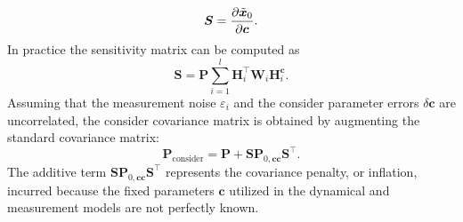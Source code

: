 \documentclass[pdflatex,sn-mathphys-num]{sn-jnl}%
\theoremstyle{thmstyleone}%
\theoremstyle{thmstyletwo}%
\theoremstyle{thmstylethree}%
\renewcommand{\vec}[1]{\boldsymbol{#1}}
\begin{document}
\begin{equation}
	\vec{S} = \pdv{\tilde{\vec{x}}_{0}}{\vec{c}}.
\end{equation}
In practice the sensitivity matrix can be computed as 
\begin{equation}
    \vec{S} = \vec{P} \sum_{i=1}^{l} \vec{H}_{i}^\top \vec{W}_i \vec{H}_{i}^{\vec{c}}.
\end{equation}
%
Assuming that the measurement noise $\varepsilon_i$ and the consider parameter errors $\delta\vec{c}$ are uncorrelated, the consider covariance matrix is obtained by augmenting the standard covariance matrix:
\begin{equation}
    \vec{P}_{\mathrm{consider}} = \vec{P} + \vec{S} \vec{P}_{0,\vec{c}\vec{c}} \vec{S}^\top.
\end{equation}
%
The additive term $\vec{S}  \vec{P}_{0,\vec{c}\vec{c}} \vec{S}^\top$ represents the covariance penalty, or inflation, incurred because the fixed parameters $\vec{c}$ utilized in the dynamical and measurement models are not perfectly known.


\end{document}

